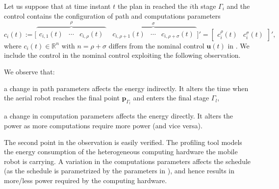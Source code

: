 Let us suppose that at time instant $t$ the plan in  reached the $i$th stage $\Gamma_i$ and the control contains the configuration of path and computations parameters 
\begin{equation}\label{eq:state-control2}
  c_i(t):=\Big[\overbrace{\begin{matrix}c_{i,1}(t)&\cdots&c_{i,\rho}(t)\end{matrix}}^{\rho} \,\,\, \overbrace{\begin{matrix}c_{i,\rho+1}(t)&\cdots&c_{i,\rho+\sigma}(t)\end{matrix}}^{\sigma}\Big]'=\begin{bmatrix}c_i^\rho(t) & c_i^\sigma(t)\end{bmatrix}',
\end{equation}
where $c_i(t)\in\mathbb{R}^n$ with $n=\rho+\sigma$ differs from the nominal control $\mathbf{u}(t)$ in . We include the control in the nominal control exploiting the following observation. 

\begin{highlight}
  \begin{obs}
    We observe that:
    \begin{enumerate*}[label={(\alph*)},font={\textit}]
      \item a change in path parameters affects the energy indirectly. It alters the time when the aerial robot reaches the final point $\mathbf{p}_{\Gamma_l}$ and enters the final stage $\Gamma_l$,
      \item a change in computation parameters affects the energy directly. It alters the power as more computations require more power (and vice versa).
    \end{enumerate*}
  \end{obs}
\end{highlight}

The second point in the observation is easily verified. The \powprof{} profiling tool models the energy consumption of the heterogeneous computing hardware the mobile robot is carrying. A variation in the computations parameters affects the schedule (as the schedule is parametrized by the parameters in ), and hence results in more/less power required by the computing hardware.

